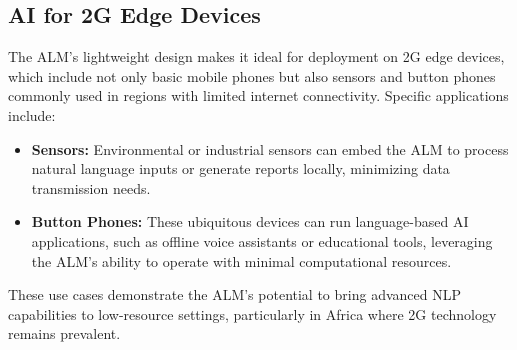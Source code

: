 \documentclass[11pt]{article}
\begin{document}
\subsection*{AI for 2G Edge Devices}
The ALM's lightweight design makes it ideal for deployment on 2G edge devices, which include not only basic mobile phones but also sensors and button phones commonly used in regions with limited internet connectivity. Specific applications include:
\begin{itemize}
    \item \textbf{Sensors:} Environmental or industrial sensors can embed the ALM to process natural language inputs or generate reports locally, minimizing data transmission needs.
    \item \textbf{Button Phones:} These ubiquitous devices can run language-based AI applications, such as offline voice assistants or educational tools, leveraging the ALM's ability to operate with minimal computational resources.
\end{itemize}
These use cases demonstrate the ALM's potential to bring advanced NLP capabilities to low-resource settings, particularly in Africa where 2G technology remains prevalent.
\end{document}
